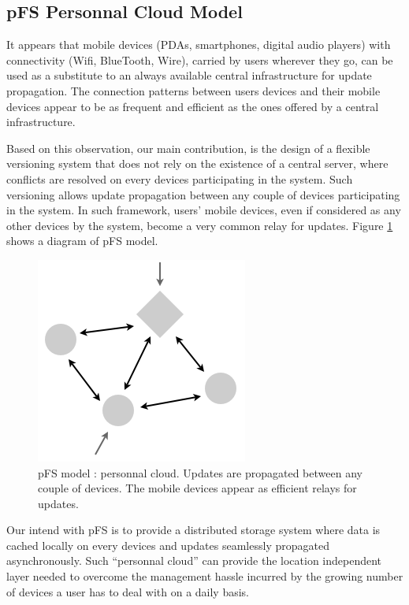 \subsection {pFS Personnal Cloud Model}

It appears that mobile devices (PDAs, smartphones, digital audio
players) with connectivity (Wifi, BlueTooth, Wire), carried by users
wherever they go, can be used as a substitute to an always available
central infrastructure for update propagation. The connection patterns
between users devices and their mobile devices appear to be as
frequent and efficient as the ones offered by a central
infrastructure.

Based on this observation, our main contribution, is the design of a
flexible versioning system that does not rely on the existence of a
central server, where conflicts are resolved on every devices
participating in the system. Such versioning allows update propagation
between any couple of devices participating in the system. In such
framework, users' mobile devices, even if considered as any other
devices by the system, become a very common relay for updates. Figure
\ref{PfsModel} shows a diagram of pFS model.

\begin{figure}[ht]
\begin{center}
  \includegraphics [scale=0.4] {img/pfs_model}
  \caption{\label{PfsModel} {\small pFS model : personnal
      cloud. Updates are propagated between any couple of
      devices. The mobile devices appear as efficient relays 
      for updates.}}
\end{center}
\end{figure}


Our intend with pFS is to provide a distributed storage system where
data is cached locally on every devices and updates seamlessly
propagated asynchronously. Such ``personnal cloud'' can provide the
location independent layer needed to overcome the management hassle
incurred by the growing number of devices a user has to deal with on a
daily basis.

